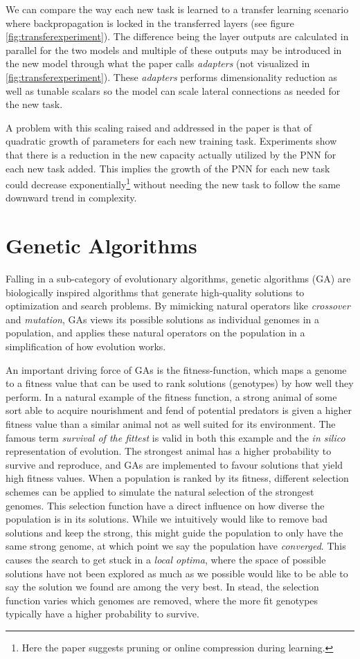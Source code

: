 We can compare the way each new task is learned to a transfer learning scenario where backpropagation is locked in the transferred layers (see figure \ref{fig:transferexperiment}). The difference being the layer outputs are calculated in parallel for the two models and multiple of these outputs may be introduced in the new model through what the paper calls \textit{adapters} (not visualized in \ref{fig:transferexperiment}). These \textit{adapters} performs dimensionality reduction as well as tunable scalars so the model can scale lateral connections as needed for the new task.

A problem with this scaling raised and addressed in the paper is that of quadratic growth of parameters for each new training task. Experiments show that there is a reduction in the new capacity actually utilized by the PNN for each new task added. This implies the growth of the PNN for each new task could decrease exponentially\footnote{Here the paper suggests pruning or online compression during learning.} without needing the new task to follow the same downward trend in complexity. 

\section{Genetic Algorithms}
\label{background:GA}
Falling in a sub-category of evolutionary algorithms, genetic algorithms (GA) are biologically inspired algorithms that generate high-quality solutions to optimization and search problems. By mimicking natural operators like \textit{crossover} and \textit{mutation}, GAs views its possible solutions as individual genomes in a population, and applies these natural operators on the population in a simplification of how evolution works. 

An important driving force of GAs is the fitness-function, which maps a genome to a fitness value that can be used to rank solutions (genotypes) by how well they perform. In a natural example of the fitness function, a strong animal of some sort able to acquire nourishment and fend of potential predators is given a higher fitness value than a similar animal not as well suited for its environment. The famous term \textit{survival of the fittest} is valid in both this example and the \textit{in silico} representation of evolution. The strongest animal has a higher probability to survive and reproduce, and GAs are implemented to favour solutions that yield high fitness values.  
When a population is ranked by its fitness, different selection schemes can be applied to simulate the natural selection of the strongest genomes. This selection function have a direct influence on how diverse the population is in its solutions. While we intuitively would like to remove bad solutions and keep the strong, this might guide the population to only have the same strong genome, at which point we say the population have \textit{converged}. This causes the search to get stuck in a \textit{local optima}, where the space of possible solutions have not been explored as much as we possible would like to be able to say the solution we found are among the very best. In stead, the selection function varies which genomes are removed, where the more fit genotypes typically have a higher probability to survive. 

